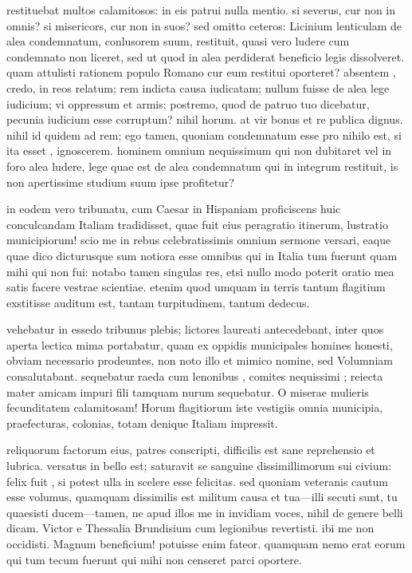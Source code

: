  restituebat multos calamitosos: in eis patrui nulla mentio. si severus, cur non in omnis? si misericors, cur non in suos? sed omitto ceteros: Licinium lenticulam de alea condemnatum, conlusorem suum, restituit, quasi vero ludere cum condemnato non liceret, sed ut quod in alea perdiderat beneficio legis dissolveret. quam attulisti rationem populo Romano cur eum restitui oporteret? absentem , credo, in reos relatum; rem indicta causa iudicatam; nullum fuisse de alea lege iudicium; vi oppressum et armis; postremo, quod de patruo tuo dicebatur, pecunia iudicium esse corruptum? nihil horum. at vir bonus et re publica dignus. nihil id quidem ad rem; ego tamen, quoniam condemnatum esse pro nihilo est, si ita esset , ignoscerem. hominem omnium nequissimum qui non dubitaret vel in foro alea ludere, lege quae est de alea condemnatum qui in integrum restituit, is non apertissime studium suum ipse profitetur?

 in eodem vero tribunatu, cum Caesar in Hispaniam proficiscens huic conculcandam Italiam tradidisset, quae fuit eius peragratio itinerum, lustratio municipiorum! scio me in rebus celebratissimis omnium sermone versari, eaque quae dico dicturusque sum notiora esse omnibus qui in Italia tum fuerunt quam mihi qui non fui: notabo tamen singulas res, etsi nullo modo poterit oratio mea satis facere vestrae scientiae. etenim quod umquam in terris tantum flagitium exstitisse auditum est, tantam turpitudinem, tantum dedecus.

 vehebatur in essedo tribunus plebis; lictores laureati antecedebant, inter quos aperta lectica mima portabatur, quam ex oppidis municipales homines honesti, obviam necessario prodeuntes, non noto illo et mimico nomine, sed Volumniam consalutabant. sequebatur raeda cum lenonibus , comites nequissimi ; reiecta mater amicam impuri fili tamquam nurum sequebatur. O miserae mulieris fecunditatem calamitosam! Horum flagitiorum iste vestigiis omnia municipia, praefecturas, colonias, totam denique Italiam impressit.

 reliquorum factorum eius, patres conscripti, difficilis est sane reprehensio et lubrica. versatus in bello est; saturavit se sanguine dissimillimorum sui civium: felix fuit , si potest ulla in scelere esse felicitas. sed quoniam veteranis cautum esse volumus, quamquam dissimilis est militum causa et tua—illi secuti sunt, tu quaesisti ducem—tamen, ne apud illos me in invidiam voces, nihil de genere belli dicam. Victor e Thessalia Brundisium cum legionibus revertisti. ibi me non occidisti. Magnum beneficium! potuisse enim fateor. quamquam nemo erat eorum qui tum tecum fuerunt qui mihi non censeret parci oportere.


